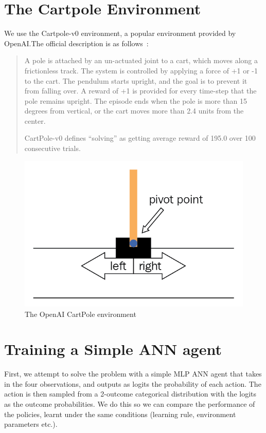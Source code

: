 \documentclass[fyp]{socreport}
\begin{document}

\section{The Cartpole Environment}


We use the Cartpole-v0 environment, a popular environment provided by
OpenAI.\@ The official description is as follows~\cite{openai_gym}:

\begin{quote} A pole is attached by an un-actuated joint to a cart, which moves
along a frictionless track. The system is controlled by applying a force of +1
or -1 to the cart. The pendulum starts upright, and the goal is to prevent it
from falling over. A reward of +1 is provided for every time-step that the pole
remains upright. The episode ends when the pole is more than 15 degrees from
vertical, or the cart moves more than 2.4 units from the center.

CartPole-v0 defines ``solving'' as getting average reward of 195.0 over 100
consecutive trials.
\end{quote}

\begin{figure}[htbp] \centering
  \includegraphics[width=.9\linewidth]{images/openai_gym.png}
  \caption{The OpenAI CartPole environment}
\end{figure}

\section{Training a Simple ANN agent}

First, we attempt to solve the problem with a simple MLP ANN agent that takes in
the four observations, and outputs as logits the probability of each action. The
action is then sampled from a 2-outcome categorical distribution with the logits
as the outcome probabilities. We do this so we can compare the performance of
the policies, learnt under the same conditions (learning rule, environment
parameters etc.).
\end{document}
